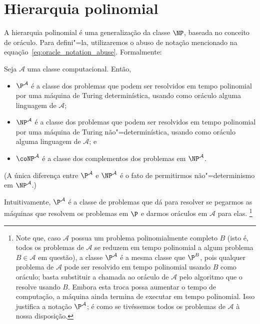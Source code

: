 \section{Hierarquia polinomial}
\label{sec:polynomial_hierarchy}

A hierarquia polinomial é uma generalização da classe $\NP$,
baseada no conceito de oráculo.
Para defini"=la,
utilizaremos o abuso de notação mencionado na equação~\ref{eq:oracle_notation_abuse}.
Formalmente:

\begin{definition}
    Seja $\mathcal A$ uma classe computacional.
    Então,
    \begin{itemize}
        \item $\P^\mathcal A$
            é a classe dos problemas que podem ser resolvidos em tempo polinomial
            por uma máquina de Turing determinística,
            usando como oráculo alguma linguagem de $\mathcal A$;
        \item $\NP^\mathcal A$
            é a classe dos problemas que podem ser resolvidos em tempo polinomial
            por uma máquina de Turing não"=determinística,
            usando como oráculo alguma linguagem de $\mathcal A$;
            e
        \item $\coNP^\mathcal A$
            é a classe dos complementos dos problemas em $\NP^\mathcal A$.
    \end{itemize}
\end{definition}

(A única diferença entre $\P^\mathcal A$ e $\NP^\mathcal A$
é o fato de permitirmos não"=determinismo em $\NP^\mathcal A$.)

Intuitivamente,
$\P^\mathcal A$ é a classe de problemas que dá para resolver
se pegarmos as máquinas que resolvem os problemas em $\P$
e darmos oráculos em $\mathcal A$ para elas.%
\footnote{
    Note que, caso $\mathcal A$ possua um problema polinomialmente completo $B$
    (isto é, todos os problemas de $\mathcal A$ se reduzem
    em tempo polinomial a algum problema $B \in \mathcal A$ em questão),
    a classe $\P^\mathcal A$
    é a mesma classe que $\P^B$,
    pois qualquer problema de $\mathcal A$
    pode ser resolvido em tempo polinomial usando $B$ como oráculo;
    basta substituir a chamada ao oráculo de $\mathcal A$
    pelo algoritmo que o resolve usando $B$.
    Embora esta troca possa aumentar o tempo de computação,
    a máquina ainda termina de executar em tempo polinomial.
    Isso justifica a notação $\P^\mathcal A$;
    é como se tivéssemos todos os problemas de $\mathcal A$ à nossa disposição.
}

